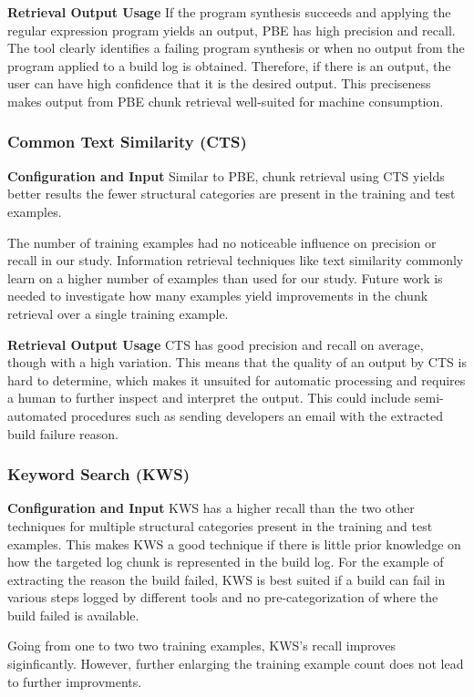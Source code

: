 \noindent
\textbf{Retrieval Output Usage}
If the program synthesis succeeds and applying the regular expression
program yields an output, PBE has high precision and recall. The tool
clearly identifies a failing program synthesis or when no output from
the program applied to a build log is obtained. Therefore, if there is
an output, the user can have high confidence that it is the desired
output. This preciseness makes output from PBE chunk retrieval
well-suited for machine consumption.

\subsubsection{Common Text Similarity (CTS)}
\noindent
\textbf{Configuration and Input}
Similar to PBE, chunk retrieval using CTS yields better results the
fewer structural categories are present in the training and test
examples.

The number of training examples had no noticeable influence on
precision or recall in our study. Information retrieval techniques
like text similarity commonly learn on a higher number of examples
than used for our study. Future work is needed to investigate how many
examples yield improvements in the chunk retrieval over a single
training example.

\noindent
\textbf{Retrieval Output Usage}
CTS has good precision and recall on average, though with a high
variation. This means that the quality of an output by CTS is hard to
determine, which makes it unsuited for automatic  processing and requires a human to further inspect and interpret the output. This could include semi-automated procedures such as sending
developers an email with the extracted build failure reason.

\subsubsection{Keyword Search (KWS)}
\noindent
\textbf{Configuration and Input}
KWS has a higher recall than the two other techniques for multiple
structural categories present in the training and test examples. This
makes KWS a good technique if there is little prior knowledge on how
the targeted log chunk is represented in the build log. For the
example of extracting the reason the build failed, KWS is best suited
if a build can fail in various steps logged by different tools and no
pre-categorization of where the build failed is available.

Going from one to two two training examples, KWS's recall improves
siginficantly. However, further enlarging the training example count
does not lead to further improvments.

